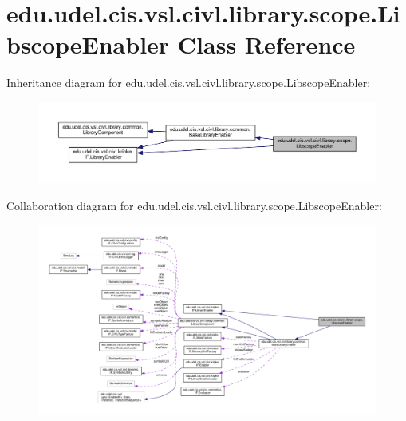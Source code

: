 \hypertarget{classedu_1_1udel_1_1cis_1_1vsl_1_1civl_1_1library_1_1scope_1_1LibscopeEnabler}{}\section{edu.\+udel.\+cis.\+vsl.\+civl.\+library.\+scope.\+Libscope\+Enabler Class Reference}
\label{classedu_1_1udel_1_1cis_1_1vsl_1_1civl_1_1library_1_1scope_1_1LibscopeEnabler}


Inheritance diagram for edu.\+udel.\+cis.\+vsl.\+civl.\+library.\+scope.\+Libscope\+Enabler\+:
\nopagebreak
\begin{figure}[H]
\begin{center}
\leavevmode
\includegraphics[width=350pt]{classedu_1_1udel_1_1cis_1_1vsl_1_1civl_1_1library_1_1scope_1_1LibscopeEnabler__inherit__graph}
\end{center}
\end{figure}


Collaboration diagram for edu.\+udel.\+cis.\+vsl.\+civl.\+library.\+scope.\+Libscope\+Enabler\+:
\nopagebreak
\begin{figure}[H]
\begin{center}
\leavevmode
\includegraphics[width=350pt]{classedu_1_1udel_1_1cis_1_1vsl_1_1civl_1_1library_1_1scope_1_1LibscopeEnabler__coll__graph}
\end{center}
\end{figure}
